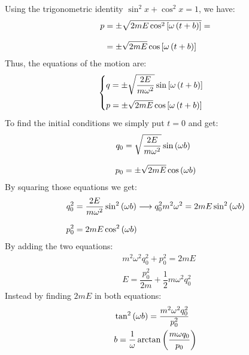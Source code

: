 Using the trigonometric identity $\sin^2 x + \cos^2 x = 1 $, we have:
\begin{equation}
  \begin{split}
    p &= \pm \sqrt{2m E \cos^2 \left[\omega\left( t + b\right)\right]}=\\[8pt]
    &= \pm \sqrt{2mE} \cos \left[\omega\left( t + b\right)\right]
  \end{split}
\end{equation}
Thus, the equations of the motion are:
\begin{equation}
  \begin{cases}
    q = \pm \sqrt{\dfrac{2E}{m\omega^2}} \sin \left[\omega\left( t + b\right)\right]\\[10pt]
    p = \pm \sqrt{2mE} \cos \left[\omega\left( t + b\right)\right]
  \end{cases}
\end{equation}
To find the initial conditions we simply put $t=0$ and get:
\begin{equation}
  \begin{split}
    q_0 &= \sqrt{\dfrac{2E}{m\omega^2}} \sin \left(\omega b\right)\\[8pt]
    p_0 &= \pm \sqrt{2mE} \cos \left(\omega b\right)
  \end{split}
\end{equation}
By squaring those equations we get:
\begin{equation}
  \begin{split}
    q_0^2 &= \dfrac{2E}{m\omega^2} \sin^2 \left(\omega b\right) \longrightarrow q_0^2m^2\omega^2 = 2mE \sin^2 \left(\omega b\right)\\[8pt]
    p_0^2 &= 2mE \cos^2 \left(\omega b\right)
  \end{split}
\end{equation}
By adding the two equations:
\begin{equation}
  \begin{split}
    &m^2\omega^2q_0^2 + p_0^2 = 2mE\\[8pt]
    &E = \dfrac{p_0^2}{2m} + \dfrac{1}{2}m\omega^2q_0^2
  \end{split}
\end{equation}
Instead by finding $2mE$ in both equations:
\begin{equation}
  \begin{split}
    &\tan^2 \left(\omega b\right) = \dfrac{m^2\omega^2q_0^2}{p_0^2}\\
    &b = \dfrac{1}{\omega} \arctan \left(\dfrac{m\omega q_0}{p_0}\right)
  \end{split}
\end{equation}
